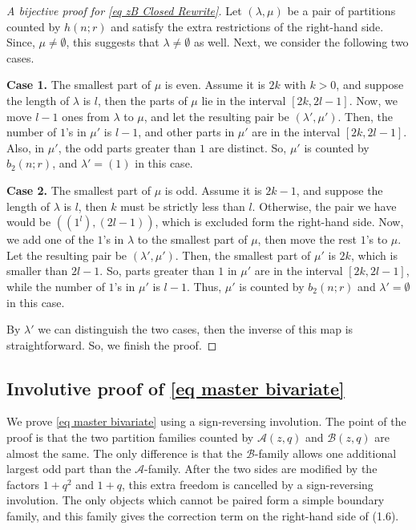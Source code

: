 \documentclass[reqno]{amsart}
\theoremstyle{definition}
\theoremstyle{plain}
\theoremstyle{remark}
\numberwithin{equation}{section}
\begin{document}
\begin{proof}[A bijective proof for \eqref{eq zB Closed Rewrite}] Let $(\lambda,\mu)$ be a pair of partitions counted by $h(n;r)$ and satisfy the extra restrictions of the right-hand side. Since, $\mu\neq\emptyset$, this suggests that $\lambda\neq\emptyset$ as well. Next, we consider the following two cases.

\textbf{Case 1.} The smallest part of $\mu$ is even. Assume it is $2k$ with $k>0$, and suppose the length of $\lambda$ is $l$, then the parts of $\mu$ lie in the interval $[2k,2l-1]$. Now, we move $l-1$ ones from $\lambda$ to $\mu$, and let the resulting pair be $(\lambda',\mu')$. Then, the number of $1$'s in $\mu'$ is $l-1$, and other parts in $\mu'$ are in the interval $[2k,2l-1]$. Also, in $\mu'$, the odd parts greater than $1$ are distinct. So, $\mu'$ is counted by $b_2(n;r)$, and $\lambda'=(1)$ in this case.

\textbf{Case 2.} The smallest part of $\mu$ is odd. Assume it is $2k-1$, and suppose the length of $\lambda$ is $l$, then $k$ must be strictly less than $l$. Otherwise, the pair we have would be $((1^l),(2l-1))$, which is excluded form the right-hand side. Now, we add one of the $1$'s in $\lambda$ to the smallest part of $\mu$, then move the rest $1$'s to $\mu$. Let the resulting pair be $(\lambda',\mu')$. Then, the smallest part of $\mu'$ is $2k$, which is smaller than $2l-1$. So, parts greater than $1$ in $\mu'$ are in the interval $[2k,2l-1]$, while the number of $1$'s in $\mu'$ is $l-1$. Thus, $\mu'$ is counted by $b_2(n;r)$ and $\lambda'=\emptyset$ in this case.

By $\lambda'$ we can distinguish the two cases, then the inverse of this map is straightforward. So, we finish the proof. 
\end{proof}


\subsection{Involutive proof of \eqref{eq master bivariate}} 
We prove \eqref{eq master bivariate} using a sign-reversing involution. The point of the proof is that the two partition families counted by
\(\mathcal A(z,q)\) and \(\mathcal B(z,q)\) are almost the same.  The only
difference is that the \(\mathcal{B}\)-family allows one additional largest odd part than the $\mathcal{A}$-family.
After the two sides are modified by the factors \(1+q^2\) and \(1+q\), this
extra freedom is cancelled by a sign-reversing involution.  The only objects
which cannot be paired form a simple boundary family, and this family gives
the correction term on the right-hand side of (1.6).
\end{document}
